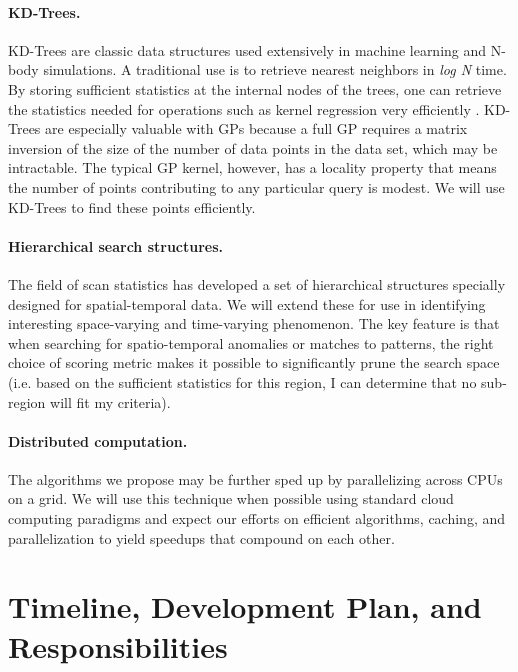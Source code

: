 \documentclass[prd,nofootbib,floatfix,11pt,tightenlines,nofootinbib]{revtex4}
\begin{document}
\paragraph{KD-Trees.}
KD-Trees are classic data structures used extensively in machine learning
and N-body simulations.  A traditional use is to retrieve nearest neighbors
in {\it log N} time.  By storing sufficient statistics at the internal
nodes of the trees, one can retrieve the statistics needed for operations
such as kernel regression very efficiently \cite{Moore97}.  KD-Trees are
especially valuable with GPs because a full GP requires a matrix inversion
of the size of the number of data points in the data set, which may be
intractable.  The typical GP kernel, however, has a locality property that
means the number of points contributing to any particular query is modest.  We will use KD-Trees to find these points efficiently.

\paragraph{Hierarchical search structures.}  
The field of scan statistics \cite{Kulldorf97,Neill03} has developed a set
of hierarchical structures specially designed for spatial-temporal data.
We will extend these for use in identifying interesting space-varying and
time-varying phenomenon.  The key feature is that when searching for
spatio-temporal anomalies or matches to patterns, the right choice of
scoring metric makes it possible to significantly prune the search space
(i.e. based on the sufficient statistics for this region, I can determine
that no sub-region will fit my criteria).

\paragraph{Distributed computation.}
The algorithms we propose may be further sped up by parallelizing across
CPUs on a grid.  We will use this technique when possible using standard
cloud computing paradigms \cite{gard07} and expect our efforts on efficient
algorithms, caching, and parallelization to yield speedups that compound on
each other.

\section{Timeline, Development Plan, and Responsibilities}
\end{document}
